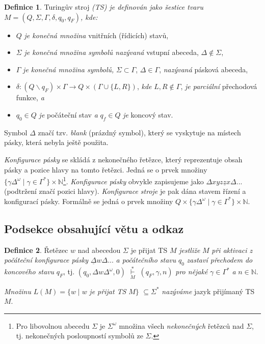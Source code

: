\documentclass[a4paper, 11pt, twocolumn, hidelinks]{article}
\theoremstyle{definition}
\newtheorem{definition}{Definice}
\begin{document}
\begin{definition}
\label{definicia1}
Turingův stroj \emph{(TS) je definován jako šestice tvaru $M=(Q, \Sigma, \Gamma, \delta, q_{0}, q_{F})$, kde:}
\begin{itemize} \itemsep0.05em
 \item $Q$ \emph{je konečná množina} vnitřních (řídicích) stavů,
 \item $\Sigma$ \emph{je konečná množina symbolů nazývaná} vstupní abeceda, $\Delta \notin \Sigma$,
 \item $\Gamma$ \emph{je konečná množina symbolů,} $\Sigma \subset \Gamma$, $\Delta \in \Gamma$, \emph{nazývaná} pásková abeceda,
 \item $\delta : (Q\backslash{q_{F}})\times\Gamma \rightarrow Q\times(\Gamma \cup\{L, R\})$, \emph{kde} $L, R \not \in\Gamma$, \emph{je parciální} přechodová funkce, \emph{a}
 \item $q_0 \in Q$ \emph{je} počáteční stav \emph{a} $q_f \in Q$ \emph{je} koncový stav.
\end{itemize}
\end{definition}

Symbol $\Delta$ značí tzv. \emph{blank} (prázdný symbol), který se vyskytuje na místech pásky, která nebyla ještě použita.

\emph{Konfigurace pásky} se skládá z nekonečného řetězce, který reprezentuje obsah pásky a pozice hlavy na tomto řetězci. Jedná se o prvek množiny $\{\gamma \Delta^{\omega}\; |\; \gamma \in \Gamma^{*}\} \times \mathbb{N}$\footnote{Pro libovolnou abecedu $\Sigma$ je $\Sigma^{\omega}$ množina všech \emph{nekonečných} řetězců nad $\Sigma$, tj. nekonečných posloupností symbolů ze $\Sigma$.}. \emph{Konfigurace pásky} obvykle zapisujeme jako $\Delta x y z \underline{z} x \Delta ...$ (podtržení značí pozici hlavy). \emph{Konfigurace stroje} je pak dána stavem řízení a konfigurací pásky. Formálně se jedná o prvek množiny $Q \times \{\gamma \Delta^{\omega}\; |\; \gamma \in \Gamma^{*}\} \times \mathbb{N}$.

\subsection{Podsekce obsahující větu a odkaz}

\begin{definition}
\label{definicia2}
Řetězec $w$ nad abecedou $\Sigma$ je přijat TS $M$ \emph{jestliže} $M$ \emph{při aktivaci z počáteční konfigurace pásky} $\underline{\Delta} w \Delta...$ \emph{a počátečního stavu} $q_0$ \emph{zastaví přechodem do \mbox{koncového} stavu} $q_{F}$, tj. $(q_{0}, \Delta w \Delta^{\omega}, 0)$  ${\underset{M}{\overset{*}{\vdash}}}$ $(q_{F}, \gamma, n)$ \emph{pro nějaké} $\gamma \in \Gamma^{*}$ \emph{a} $n \in \mathbb{N}$.

\emph{Množinu} $L(M)=\{w\;|\;w$ \emph{je přijat TS} $M\}$ $\subseteq \Sigma^{*}$ \emph{nazý\-váme} jazyk přijímaný TS $M$.
\end{definition}
\end{document}
